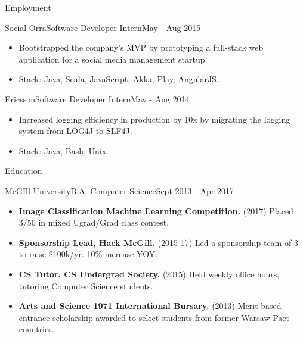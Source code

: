 \documentclass[]{muchicv}
\begin{document}
\begin{cvsection}{Employment}
		\begin{cvsubsection}{Social Orra}{Software Developer Intern}{May - Aug 2015}
			\begin{itemize}
				\item Bootstrapped the company's MVP by prototyping a full-stack web application for a social media management startup.
				\item Stack: Java, Scala, JavaScript, Akka, Play, AngularJS.
			\end{itemize}
		\end{cvsubsection}
		
		\begin{cvsubsection}{Ericsson}{Software Developer Intern}{May - Aug 2014}
			\begin{itemize}
				\item Increased logging efficiency in production by 10x by migrating the logging system from LOG4J to SLF4J.
				\item Stack: Java, Bash, Unix.
			\end{itemize}
		\end{cvsubsection}
	\end{cvsection}
	
	\begin{cvsection}{Education}
		\begin{cvsubsection}{McGIll University}{B.A. Computer Science}{Sept 2013 - Apr 2017}
			\begin{itemize}
				\item \textbf{Image Classification Machine Learning Competition.} (2017) Placed 3/50 in mixed Ugrad/Grad class contest.
				\item \textbf{Sponsorship Lead, Hack McGill.} (2015-17) Led a sponsorship team of 3 to raise \$100k/yr. 10\% increase YOY.
				\item \textbf{CS Tutor, CS Undergrad Society.} (2015) Held weekly office hours, tutoring Computer Science students.
				\item \textbf{Arts and Science 1971 International Bursary.} (2013) Merit based entrance scholarship awarded to select students from former Warsaw Pact countries.
			\end{itemize}
		\end{cvsubsection}
	\end{cvsection}
	
\end{document}

